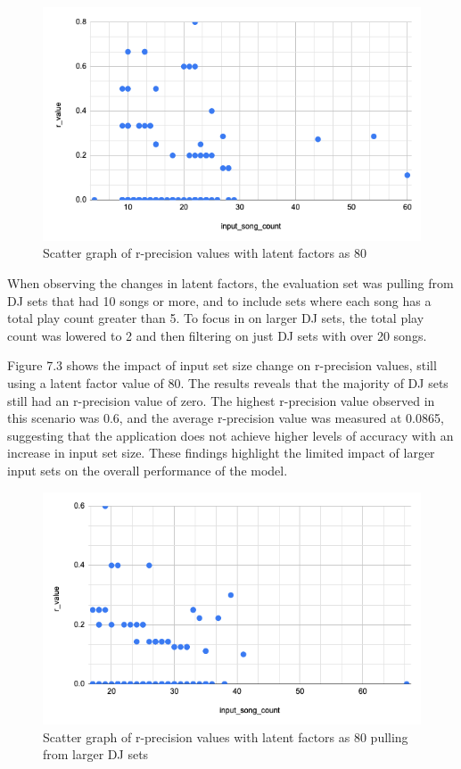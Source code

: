 \begin{figure}[H]
	\includegraphics[scale=0.6]{images/80_little_sets}
	\centering
	\caption{Scatter graph of r-precision values with latent factors as 80} 
\end{figure}


When observing the changes in latent factors, the evaluation set was pulling from DJ sets that had 10 songs or more, and to include sets where each song has a total play count greater than 5. To  focus in on larger DJ sets, the total play count was lowered to 2 and then filtering on just DJ sets with over 20 songs.

Figure 7.3 shows the impact of input set size change on r-precision values, still using a latent factor value of 80. The results reveals  that the majority of DJ sets still had an r-precision value of zero. The highest r-precision value observed in this scenario was 0.6, and the average r-precision value was measured at 0.0865, suggesting that the application does not achieve higher levels of accuracy with an increase in input set size. These findings highlight the limited impact of larger input sets on the overall performance of the model.

\begin{figure}[H]
	\includegraphics[scale=0.6]{images/80_big_sets}
	\centering
	\caption{Scatter graph of r-precision values with latent factors as 80 pulling from larger DJ sets} 
\end{figure}


